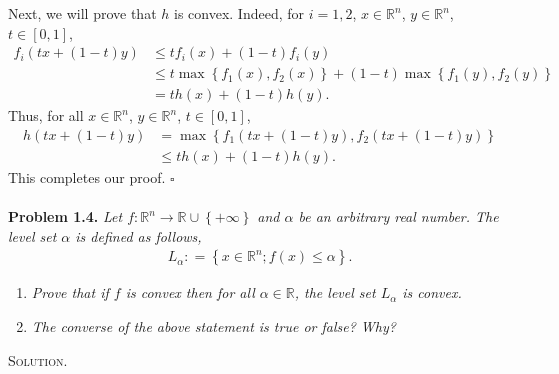 \documentclass[a4paper]{article}
\numberwithin{equation}{section}
\begin{document}
Next, we will prove that $h$ is convex. Indeed, for $i=1,2$, $x\in \mathbb{R}^n$, $y\in \mathbb{R}^n$, $t\in \left[0,1\right]$,
\begin{align}
{f_i}\left( {tx + \left( {1 - t} \right)y} \right) &\le t{f_i}\left( x \right) + \left( {1 - t} \right){f_i}\left( y \right)\\
& \le t\max \left\{ {{f_1}\left( x \right),{f_2}\left( x \right)} \right\} + \left( {1 - t} \right)\max \left\{ {{f_1}\left( y \right),{f_2}\left( y \right)} \right\}\\
& = th\left( x \right) + \left( {1 - t} \right)h\left( y \right).
\end{align}
Thus, for all $x\in \mathbb{R}^n$, $y\in \mathbb{R}^n$, $t\in \left[0,1\right]$,
\begin{align}
h\left( {tx + \left( {1 - t} \right)y} \right) &= \max \left\{ {{f_1}\left( {tx + \left( {1 - t} \right)y} \right),{f_2}\left( {tx + \left( {1 - t} \right)y} \right)} \right\}\\
& \le th\left( x \right) + \left( {1 - t} \right)h\left( y \right).
\end{align}
This completes our proof. \hfill $\square$\\
\\
\textbf{Problem 1.4.} \textit{Let $f:{\mathbb{R}^n} \to \mathbb{R} \cup \left\{ { + \infty } \right\}$ and $\alpha$ be an arbitrary real number. The level set $\alpha$ is defined as follows,}
\begin{align}
{L_\alpha }: = \left\{ {x \in {\mathbb{R}^n};f\left( x \right) \le \alpha } \right\}.
\end{align}
\begin{enumerate}
\item \textit{Prove that if $f$ is convex then for all $\alpha \in \mathbb{R}$, the  level set $L_\alpha$ is convex.}
\item \textit{The converse of the above statement is true or false? Why?}
\end{enumerate}
\textsc{Solution.} 
\end{document}
